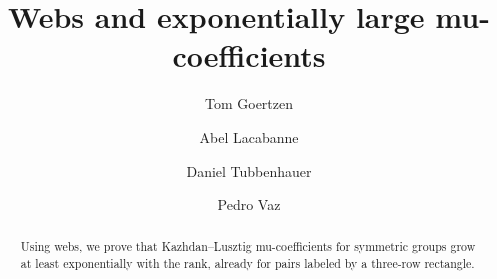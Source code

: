 \documentclass[a4paper,11pt]{amsart}
\numberwithin{equation}{subsection}
\theoremstyle{plain}
\theoremstyle{definition}
\theoremstyle{remark}
\begin{document}
\title[Webs and exponentially large mu-coefficients]{Webs and exponentially large mu-coefficients}

\author{Tom Goertzen}
\address{T.G.: The University of Sydney,
School of Mathematics and Statistics F07,
NSW 2006, Australia,
\href{https://profiles.sydney.edu.au/tom.goertzen}
{profiles.sydney.edu.au/tom.goertzen},
\href{https://orcid.org/0009-0003-3399-3416}
{ORCID 0009-0003-3399-3416}}

\author{Abel Lacabanne}
\address{A.L.: Laboratoire de Math\'ematiques Blaise Pascal (UMR 6620),
Universit\'e Clermont Auvergne,
Campus Universitaire des C\'ezeaux, 3 place Vasarely,
63178 Aubi\`ere Cedex, France,
\href{https://www.normalesup.org/~lacabanne/}
{www.normalesup.org/\textasciitilde lacabanne},
\href{https://orcid.org/0000-0001-8691-3270}
{ORCID 0000-0001-8691-3270}}

\author{Daniel Tubbenhauer}
\address{D.T.: The University of Sydney,
School of Mathematics and Statistics F07,
Office Carslaw 827, NSW 2006, Australia,
\href{http://www.dtubbenhauer.com}
{www.dtubbenhauer.com},
\href{https://orcid.org/0000-0001-7265-5047}
{ORCID 0000-0001-7265-5047}}

\author{Pedro Vaz}
\address{P.V.: Institut de Recherche en Math\'ematique et Physique,
Universit\'e catholique de Louvain,
Chemin du Cyclotron 2, 1348 Louvain-la-Neuve, Belgium,
\href{https://perso.uclouvain.be/pedro.vaz/}
{perso.uclouvain.be/pedro.vaz},
\href{https://orcid.org/0000-0001-9422-4707}
{ORCID 0000-0001-9422-4707}}
\date{}

\begin{abstract}
Using webs, we prove that Kazhdan--Lusztig mu-coefficients for symmetric groups grow at least exponentially with the rank, already for pairs labeled by a three-row rectangle.
\end{abstract}


\maketitle
\tableofcontents
\end{document}
